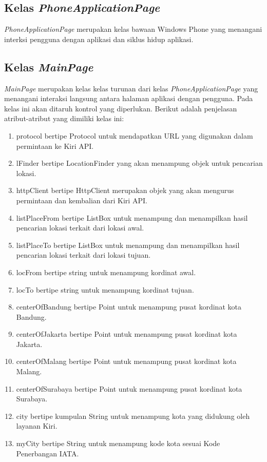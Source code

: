 \subsection{Kelas \textit{PhoneApplicationPage}}
\label{lab:Kelas PhoneApplicationPage}
\hspace{0.5cm} \textit{PhoneApplicationPage} merupakan kelas bawaan Windows Phone yang menangani interksi pengguna dengan aplikasi dan siklus hidup aplikasi.

\subsection{Kelas \textit{MainPage}}
\label{lab:Kelas MainPage}
\hspace{0.5cm} \textit{MainPage} merupakan kelas kelas turunan dari kelas \textit{PhoneApplicationPage} yang menangani interaksi langsung antara halaman aplikasi dengan pengguna. Pada kelas ini akan ditaruh kontrol yang diperlukan. Berikut adalah penjelasan atribut-atribut yang dimiliki kelas ini:
\begin{enumerate}
	\item protocol bertipe Protocol untuk mendapatkan URL yang digunakan dalam permintaan ke Kiri API.
	\item lFinder bertipe LocationFinder yang akan menampung objek untuk pencarian lokasi.
	\item httpClient bertipe HttpClient merupakan objek yang akan mengurus permintaan dan kembalian dari Kiri API.
	\item listPlaceFrom bertipe ListBox untuk menampung dan menampilkan hasil pencarian lokasi terkait dari lokasi awal.
	\item listPlaceTo bertipe ListBox untuk menampung dan menampilkan hasil pencarian lokasi terkait dari lokasi tujuan.
	\item locFrom bertipe string untuk menampung kordinat awal.
	\item locTo bertipe string untuk menampung kordinat tujuan.
	\item centerOfBandung bertipe Point untuk menampung pusat kordinat kota Bandung.
	\item centerOfJakarta bertipe Point untuk menampung pusat kordinat kota Jakarta.
	\item centerOfMalang bertipe Point untuk menampung pusat kordinat kota Malang.
	\item centerOfSurabaya bertipe Point untuk menampung pusat kordinat kota Surabaya.
	\item city bertipe kumpulan String untuk menampung kota yang didukung oleh layanan Kiri.
	\item myCity bertipe String untuk menampung kode kota sesuai Kode Penerbangan IATA.
\end{enumerate}

